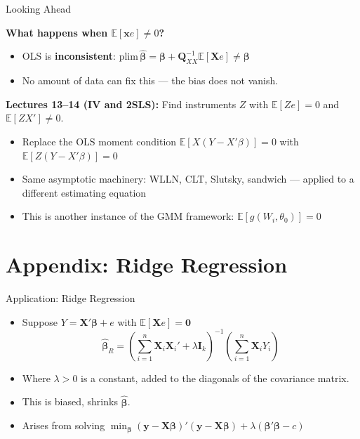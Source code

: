 \documentclass[aspectratio=169, handout, t]{beamer}
\numberwithin{equation}{section}
\begin{document}
\begin{frame}{Looking Ahead}

\textbf{What happens when $\mathbb{E}[\bm{x}e] \neq 0$?}

\pause

\begin{itemize}
    \item OLS is \textbf{inconsistent}: $\text{plim}\,\hat{\bm{\beta}} = \bm{\beta} + \bm{Q}_{XX}^{-1}\mathbb{E}[\bm{X}e] \neq \bm{\beta}$
    \item No amount of data can fix this --- the bias does not vanish.
\end{itemize}

\pause

\bigskip

\textbf{Lectures 13--14 (IV and 2SLS):} Find instruments $Z$ with $\mathbb{E}[Ze] = 0$ and $\mathbb{E}[ZX'] \neq 0$.
\begin{itemize}
    \item Replace the OLS moment condition $\mathbb{E}[X(Y - X'\beta)] = 0$ with $\mathbb{E}[Z(Y - X'\beta)] = 0$
    \item Same asymptotic machinery: WLLN, CLT, Slutsky, sandwich --- applied to a different estimating equation
    \item This is another instance of the GMM framework: $\mathbb{E}[g(W_i, \theta_0)] = 0$
\end{itemize}

\end{frame}

\appendix
\section{Appendix: Ridge Regression}

\begin{frame}{Application: Ridge Regression}
\begin{itemize}
\item Suppose $Y=\bm{X}'\bm{\beta}+e$ with $\mathbb{E}[\bm{X}e]=\bm{0}$
$$\hat{\bm{\beta}}_R=\left(\sum_{i=1}^n \bm{X}_i\bm{X}_i'+\lambda \bm{I}_k\right)^{-1}\left(\sum_{i=1}^n \bm{X}_iY_i\right)$$
\item Where $\lambda>0$ is a constant, added to the diagonals of the covariance matrix.
\item This is biased, shrinks $\hat{\bm{\beta}}$.
\item Arises from solving $\min_{\bm{\beta}} (\bm{y}-\bm{X}\bm{\beta})'(\bm{y}-\bm{X}\bm{\beta})+\lambda(\bm{\beta}'\bm{\beta}-c)$
\end{itemize}
\end{frame}
\end{document}
